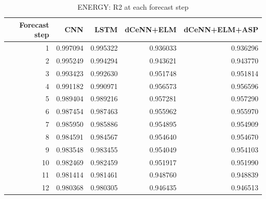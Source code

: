 \begin{table}
\caption{ENERGY: R2 at each forecast step}
\begin{tabular}{rrrrr}
\toprule
Forecast step & CNN & LSTM & dCeNN+ELM & dCeNN+ELM+ASP \\
\midrule
1 & 0.997094 & 0.995322 & 0.936033 & 0.936296 \\
2 & 0.995249 & 0.994294 & 0.943621 & 0.943770 \\
3 & 0.993423 & 0.992630 & 0.951748 & 0.951814 \\
4 & 0.991182 & 0.990971 & 0.956573 & 0.956596 \\
5 & 0.989404 & 0.989216 & 0.957281 & 0.957290 \\
6 & 0.987454 & 0.987463 & 0.955962 & 0.955970 \\
7 & 0.985950 & 0.985886 & 0.954895 & 0.954909 \\
8 & 0.984591 & 0.984567 & 0.954640 & 0.954670 \\
9 & 0.983548 & 0.983455 & 0.954049 & 0.954103 \\
10 & 0.982469 & 0.982459 & 0.951917 & 0.951990 \\
11 & 0.981414 & 0.981461 & 0.948760 & 0.948839 \\
12 & 0.980368 & 0.980305 & 0.946435 & 0.946513 \\
\bottomrule
\end{tabular}
\end{table}
